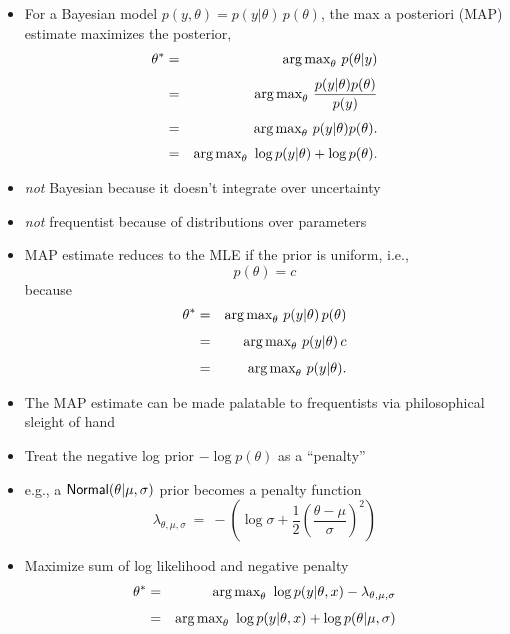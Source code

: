 \documentclass[10pt]{report}
\begin{document}
%
\vspace*{-4pt}
\begin{itemize}
\item For a Bayesian model $p(y,\theta) = p(y|\theta) \, p(\theta)$,
the max a posteriori (MAP) estimate maximizes the posterior,
\begin{eqnarray*}
\theta^{*} 
& = & \mbox{arg\,max}_{\theta} \ p(\theta|y)
\\[3pt]
& = & \mbox{arg\,max}_{\theta} \ \frac{\displaystyle p(y|\theta) p(\theta)}{p(y)}
\\[3pt]
& = & \mbox{arg\,max}_{\theta} \ p(y|\theta) p(\theta).
\\[3pt]
& = & \mbox{arg\,max}_{\theta} \ \log p(y|\theta) + \log p(\theta).
\end{eqnarray*}
\item \emph{not} Bayesian because it doesn't integrate over uncertainty
\item \emph{not} frequentist because of distributions over parameters
\end{itemize}


%
\begin{itemize}
\item MAP estimate reduces to the MLE if the prior is uniform, i.e.,
\[
p(\theta) = c
\]
because
\begin{eqnarray*}
\theta^{*} & = & \mbox{arg\,max}_{\theta} \ p(y|\theta) \, p(\theta)
\\[4pt]
& = & \mbox{arg\,max}_{\theta} \ p(y|\theta) \, c
\\[4pt]
& = & \mbox{arg\,max}_{\theta} \ p(y|\theta).
\end{eqnarray*}
\end{itemize}


%
\begin{itemize}
\item The MAP estimate can be made palatable to frequentists 
via philosophical sleight of hand 
\item Treat the negative log prior $-\log p(\theta)$ as a ``penalty''
\item e.g., a $\text{\sf Normal}(\theta|\mu,\sigma)$ prior becomes a penalty function 
\[
\lambda_{\theta, \mu,\sigma}
\  = \ 
-\left( 
   \log \sigma + \frac{1}{2}\left(\frac{\theta -  \mu}{\sigma}\right)^2 
 \right)
\]
\item Maximize sum of log likelihood and negative penalty
\begin{eqnarray*}
\theta^{*} 
& = & \mbox{arg\,max}_{\theta} \ \log p(y|\theta,x) - \lambda_{\theta,\mu,\sigma}
\\[4pt]
& = & \mbox{arg\,max}_{\theta} \ \log p(y|\theta,x) + \log p(\theta|\mu,\sigma)
\end{eqnarray*}
\end{itemize}
\end{document}
